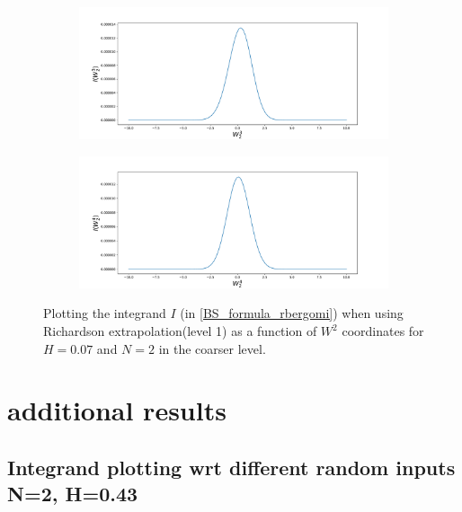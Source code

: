 \documentclass[11pt]{article}
\begin{document}
\begin{figure}[h!]
 	\begin{subfigure}[b]{0.4\textwidth}
 		\centering
 		\includegraphics[width=1\linewidth]{./figures/integrand_richardson_plotting_rBergomi/N_2/W_2/Bergomi_integrand_rich_level1_K_1_H_007_y7f_N_2}
 		\caption{}
 		\label{fig:sub3}
 	\end{subfigure}
 	\hfill
 	\begin{subfigure}[b]{0.4\textwidth}
 		\centering
 		\includegraphics[width=1\linewidth]{./figures/integrand_richardson_plotting_rBergomi/N_2/W_2/Bergomi_integrand_rich_level1_K_1_H_007_y8f_N_2}
 		\caption{}
 		\label{fig:sub4}
 	\end{subfigure}
 	\caption{Plotting the integrand $I$ (in \eqref{BS_formula_rbergomi}) when using Richardson extrapolation(level 1) as a function of $W^2$ coordinates for $H=0.07$ and $N=2$ in the coarser level.}
 	\label{fig:Integrand_rich_level1_H_007_N_2_W_2}
 \end{figure}
 
 
 
 
\newpage
\section{additional results}\label{appendix:additional results}
\subsection{Integrand plotting wrt different random inputs N=2, H=0.43}\label{Appendix:Integrand plotting wrt different random inputs N=2, H=0.43}
\end{document}
